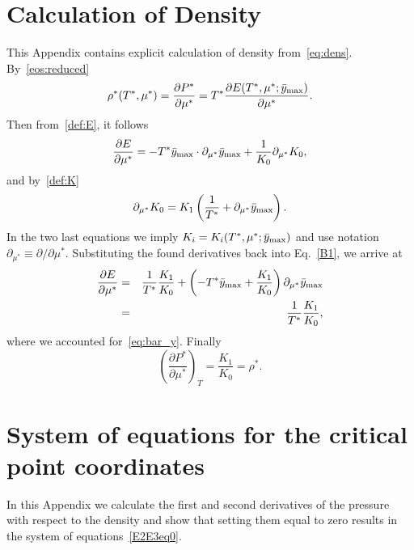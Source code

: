 \documentclass[12pt]{article}
\numberwithin{equation}{section}
\begin{document}
	\pagebreak	
		
	\section{\label{sec:app:dens} Calculation of Density}
	This Appendix contains explicit calculation of density from~\eqref{eq:dens}. By~\eqref{eos:reduced}
	\begin{equation}
		\label{B1}
		\rho^*(T^*,\mu^*) = \frac{\partial P^*}{\partial \mu^*} = T^* \frac{\partial E(T^*,\mu^*;\bar{y}_{\rm max})}{\partial \mu^*}.
	\end{equation}
	Then from~\eqref{def:E}, it follows
	\begin{equation}
		\frac{\partial E}{\partial \mu^*} = -T^* \bar{y}_{\rm max} \cdot \partial_{\mu^*} \bar{y}_{\rm max} + \frac{1}{K_0} \partial_{\mu^*} K_0,
	\end{equation}
	and by~\eqref{def:K}
	\begin{equation}
		\partial_{\mu^*} K_0 = K_1\left(\frac{1}{T^*} + \partial_{\mu^*} \bar{y}_{\rm max}\right).
	\end{equation}
	In the two last equations we imply $K_i = K_i(T^*,\mu^*;\bar{y}_{\rm max})$ and use notation $\partial_{\mu^*} \equiv \partial / \partial \mu^*$.
	Substituting the found derivatives back into Eq.~\eqref{B1}, we arrive at
	\begin{eqnarray}
		\frac{\partial E}{\partial \mu^*} & = & \frac{1}{T^*} \frac{K_1}{K_0} + \left(-T^*\bar{y}_{\rm max} + \frac{K_1}{K_0}\right)\partial_{\mu^*}\bar{y}_{\rm max}
		\nonumber\\
		& = & \frac{1}{T^*} \frac{K_1}{K_0},
	\end{eqnarray}
	where we accounted for~\eqref{eq:bar_y}.
	Finally
	\begin{equation}
		\left(\frac{\partial P^*}{\partial \mu^*} \right)_T = \frac{K_1}{K_0} = \rho^*.
	\end{equation}
	
	\section{\label{sec:app:cp} System of equations for the critical point coordinates}
	In this Appendix we calculate the first and second derivatives of the pressure with respect to the density and show that setting them equal to zero results in the system of equations~\eqref{E2E3eq0}.
	
\end{document}
